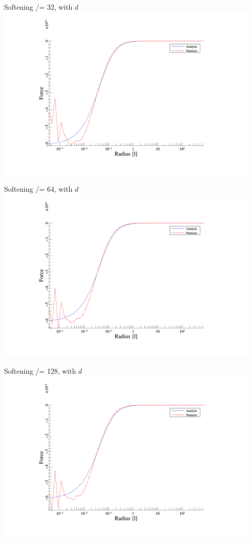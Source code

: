 \begin{frame}{Softening /= 32, with $d$}
	\includegraphics[width=0.95\textwidth]{figures/plots/forces_d_32.png}
\end{frame}

\begin{frame}{Softening /= 64, with $d$}
	\includegraphics[width=0.95\textwidth]{figures/plots/forces_d_64.png}
\end{frame}

\begin{frame}{Softening /= 128, with $d$}
	\includegraphics[width=0.95\textwidth]{figures/plots/forces_d_128.png}
\end{frame}

